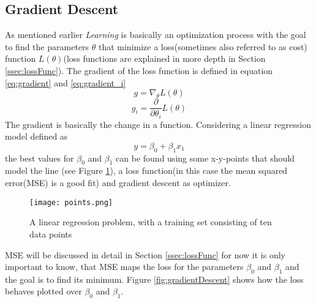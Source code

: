 \subsection{Gradient Descent}\label{ssec:gradientDescent}
As mentioned earlier \emph{Learning} is basically an optimization process with the goal to find the parameters $\theta$ that minimize a loss(sometimes also referred to as cost) function $L(\theta)$(loss functions are explained in more depth in Section \ref{ssec:lossFunc}).
The gradient of the loss function is defined in equation \ref{eq:gradient} and \ref{eq:gradient_i}
\begin{equation} \label{eq:gradient}
g = \nabla_{\theta} L(\theta)
\end{equation}
\begin{equation} \label{eq:gradient_i}
g_i = \frac{\partial}{\partial\theta_{i}}  L(\theta)
\end{equation}
The gradient is basically the change in a function. 
Considering a linear regression model defined as 
\begin{equation}
y = \beta_0 + \beta_1 x_1
\end{equation}
the best values for $\beta_0$ and $\beta_1$ can be found using some x-y-points that should model the line (see Figure \ref{fig:points}), a loss function(in this case the mean squared error(MSE) is a good fit) and gradient descent as optimizer.
\begin{figure}
\centering
  \texttt{[image: points.png]}
  \caption{A linear regression problem, with a training set consisting of ten data points \cite{Goodfellow-et-al-2016}
}\label{fig:points}
\end{figure}
MSE will be discussed in detail in Section \ref{ssec:lossFunc} for now it is only important to know, that MSE maps the loss for the parameters $\beta_0$ and $\beta_1$ and the goal is to find its minimum.
Figure \ref{fig:gradientDescent} shows how the loss behaves plotted over $\beta_0$ and $\beta_1$.

